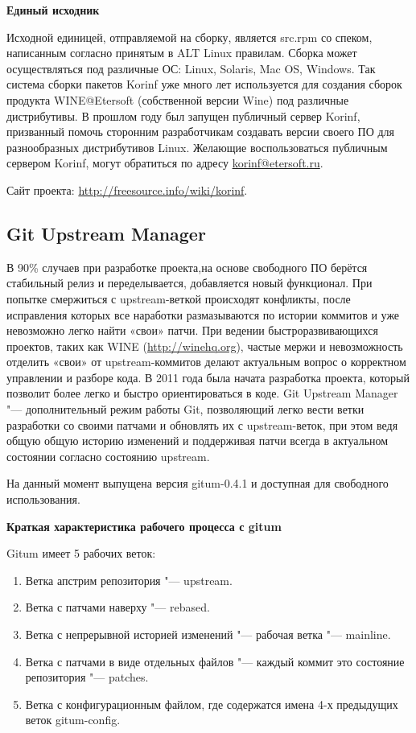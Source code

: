 \documentclass[10pt, a5paper]{article}
\begin{document}
\textbf{Единый исходник}

Исходной единицей, отправляемой на сборку, является src.rpm со спеком, написанным согласно принятым в ALT Linux правилам.
Сборка может осуществляться под различные ОС: Linux, Solaris, Mac OS, Windows.
Так система сборки пакетов Korinf уже много лет используется для создания сборок продукта WINE@Etersoft (собственной версии Wine) под различные дистрибутивы. В прошлом году был запущен публичный сервер Korinf, призванный помочь сторонним разработчикам создавать версии своего ПО для разнообразных дистрибутивов Linux. Желающие воспользоваться публичным сервером Korinf, могут обратиться по адресу \url{korinf@etersoft.ru}.

Сайт проекта: \url{http://freesource.info/wiki/korinf}.

\subsection*{Git Upstream Manager}

В 90\% случаев при разработке проекта,на основе свободного ПО берётся стабильный релиз и переделывается, добавляется новый функционал. При попытке смержиться с upstream-веткой происходят конфликты, после исправления которых все наработки размазываются по истории коммитов и уже невозможно легко найти «свои» патчи. При ведении быстроразвивающихся проектов, таких как WINE (\url{http://winehq.org}), частые мержи и невозможность отделить «свои» от upstream-коммитов делают актуальным вопрос о корректном управлении и разборе кода. В 2011 года была начата разработка проекта, который позволит более легко и быстро ориентироваться в коде.
Git Upstream Manager "--- дополнительный режим работы Git, позволяющий легко вести ветки разработки со своими патчами и обновлять их с upstream-веток, при этом ведя общую общую историю изменений и поддерживая патчи всегда в актуальном состоянии согласно состоянию upstream.

На данный момент выпущена версия gitum-0.4.1 и доступная для свободного использования.

\textbf{Краткая характеристика рабочего процесса с gitum}

Gitum имеет 5 рабочих веток:

\begin{enumerate}
  \item Ветка апстрим репозитория "--- upstream.
  \item Ветка с патчами наверху "--- rebased.
  \item Ветка с непрерывной историей изменений "--- рабочая ветка "--- mainline.
  \item Ветка с патчами в виде отдельных файлов "--- каждый коммит это состояние репозитория "--- patches.
  \item Ветка с конфигурационным файлом, где содержатся имена 4-х предыдущих веток gitum-config.
  \end{enumerate}
\end{document}
